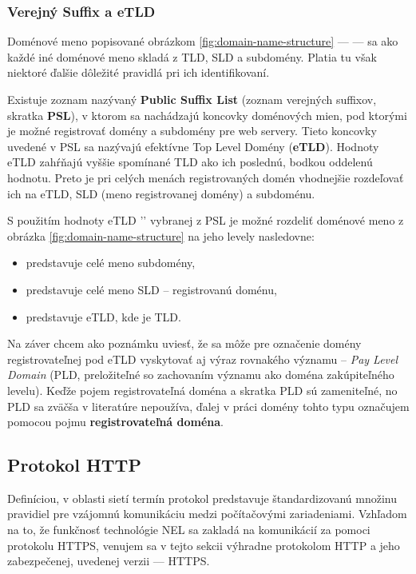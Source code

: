 \subsubsection{Verejný Suffix a eTLD}
\label{public-suffix-and-etld}

Doménové meno popisované obrázkom \ref{fig:domain-name-structure} ---  --- sa ako každé iné doménové meno skladá z TLD, SLD a subdomény. 
Platia tu však niektoré ďalšie dôležité pravidlá pri ich identifikovaní.

Existuje zoznam nazývaný \textbf{Public Suffix List} (zoznam verejných suffixov, skratka \textbf{PSL}), v ktorom sa nachádzajú koncovky doménových mien, pod ktorými je možné registrovať domény a subdomény pre web servery.
Tieto koncovky uvedené v PSL sa nazývajú efektívne Top Level Domény (\textbf{eTLD}).
Hodnoty eTLD zahŕňajú vyššie spomínané TLD ako ich poslednú, bodkou oddelenú hodnotu.
Preto je pri celých menách registrovaných domén vhodnejšie rozdeľovať ich na eTLD, SLD (meno registrovanej domény) a subdoménu.

S použitím hodnoty eTLD '' vybranej z PSL je možné rozdeliť doménové meno z obrázka \ref{fig:domain-name-structure} na jeho levely nasledovne: 
\begin{itemize}
    \item {} predstavuje celé meno subdomény,
    \item {} predstavuje celé meno SLD -- registrovanú doménu,
    \item {} predstavuje eTLD, kde  je TLD.
\end{itemize}


Na záver chcem ako poznámku uviesť, že sa môže pre označenie domény registrovateľnej pod eTLD vyskytovať aj výraz rovnakého významu -- \textit{Pay Level Domain} (PLD, preložiteľné so zachovaním významu ako doména zakúpiteľného levelu).
Keďže pojem registrovateľná doména a skratka PLD sú zameniteľné, no PLD sa zväčša v literatúre nepoužíva, 
ďalej v práci domény tohto typu označujem pomocou pojmu \textbf{registrovateľná doména}.

\subsection{Protokol HTTP}
\label{protokol-http}
Definíciou, v oblasti sietí termín protokol predstavuje štandardizovanú množinu pravidiel pre vzájomnú komunikáciu medzi počítačovými zariadeniami. %
Vzhľadom na to, že funkčnosť technológie NEL sa zakladá na komunikácií za pomoci protokolu HTTPS, %
venujem sa v tejto sekcii výhradne protokolom HTTP a jeho zabezpečenej, uvedenej verzii --- HTTPS. 

